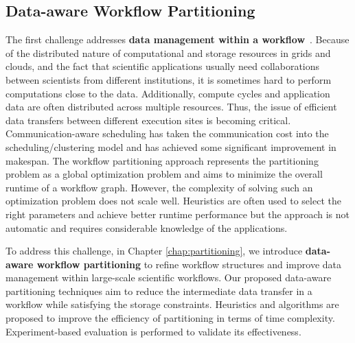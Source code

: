 

\subsection{Data-aware Workflow Partitioning}

The first challenge addresses \textbf{data management within a workflow}~\cite{wang2013supporting, wang2012scimate, wang2014removing}. 
Because of the distributed nature of computational and storage resources in grids and clouds, and the fact that scientific applications usually need collaborations between scientists from different institutions, it is sometimes hard to perform computations close to the data. Additionally, compute cycles and application data are often distributed across multiple resources. 
Thus, the issue of efficient data transfers between different execution sites is becoming critical. 
Communication-aware scheduling \cite{Sonmez2006, Jones2004} has taken the communication cost into the scheduling/clustering model and has achieved some significant improvement in makespan. The workflow partitioning approach \cite{Hedayat2009, Yuan2010, Wieczorek2005,Rubing2005} represents the partitioning problem as a global optimization problem and aims to minimize the overall runtime of a workflow graph. However, the complexity of solving such an optimization problem does not scale well. Heuristics \cite{Maheshwari2012, Callaghan2010} are often used to select the right parameters and achieve better runtime performance but the approach is not automatic and requires considerable knowledge of the applications. 

To address this challenge, in Chapter \ref{chap:partitioning}, we introduce \textbf{data-aware workflow partitioning} to refine workflow structures and improve data management within large-scale scientific workflows. 
Our proposed data-aware partitioning techniques aim to reduce the intermediate data transfer in a workflow while satisfying the storage constraints. Heuristics and algorithms are proposed to improve the efficiency of partitioning in terms of time complexity. Experiment-based evaluation is performed to validate its effectiveness.  

